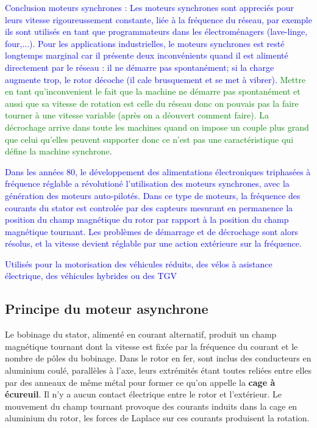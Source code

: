 \documentclass{article}
\begin{document}
\textcolor{blue}{Conclusion moteurs synchrones : Les moteurs synchrones sont appreciés pour leurs vitesse rigoureussement constante, liée à la fréquence du réseau, par exemple ils sont utilisés en tant que programmateurs dans les électroménagers (lave-linge, four,...). Pour les applications industrielles, le moteurs synchrones est resté longtemps marginal car il présente deux inconvénients quand il est alimenté directement par le réseau : il ne démarre pas spontanément; si la charge augmente trop, le rotor décoche (il cale brusquement et se met à vibrer).} \textcolor{green}{Mettre en tant qu'inconvenient le fait que la machine ne démarre pas spontanément et aussi que sa vitesse de rotation est celle du réseau donc on pouvais pas la faire tourner à une vitesse variable (après on a déouvert comment faire). La décrochage arrive dans toute les machines quand on impose un couple plus grand que celui qu'elles peuvent supporter donc ce n'est pas une caractéristique qui défine la machine synchrone}. \medskip

\textcolor{blue}{Dans les années 80, le développement des alimentations électroniques triphasées à fréquence réglable a révolutioné l'utilisation des moteurs synchrones, avec la génération des moteurs auto-pilotés. Dans ce type de moteurs, la fréquence des courants du stator est controlée par des capteurs mesurant en permanence la position du champ magnétique du rotor par rapport à la position du champ magnétique tournant. Les problèmes de démarrage et de décrochage sont alors résolus, et la vitesse devient réglable par une action extérieure sur la fréquence.}

\textcolor{blue}{Utilisés pour la motorisation des véhicules réduits, des vélos à asistance électrique, des véhicules hybrides ou des TGV}




\subsection{Principe du moteur asynchrone}

Le bobinage du stator, alimenté en courant alternatif, produit un champ magnétique tournant dont la vitesse est fixée par la fréquence du courant et le nombre de pôles du bobinage. Dans le rotor en fer, sont inclus des conducteurs en aluminium coulé, parallèles à l’axe, leurs extrémités étant toutes reliées entre elles par des anneaux de même métal pour former ce qu’on appelle la \textbf{cage à écureuil}. Il n’y a aucun contact électrique entre le rotor et l’extérieur. Le mouvement du champ tournant provoque des courants induits dans la cage en aluminium du rotor, les forces de Laplace sur ces courants produisent la rotation.\medskip
\end{document}
